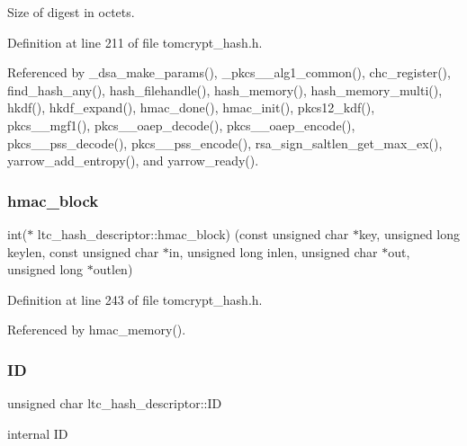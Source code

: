 Size of digest in octets. 



Definition at line 211 of file tomcrypt\+\_\+hash.\+h.



Referenced by \+\_\+dsa\+\_\+make\+\_\+params(), \+\_\+pkcs\+\_\+\_\+alg1\+\_\+common(), chc\+\_\+register(), find\+\_\+hash\+\_\+any(), hash\+\_\+filehandle(), hash\+\_\+memory(), hash\+\_\+memory\+\_\+multi(), hkdf(), hkdf\+\_\+expand(), hmac\+\_\+done(), hmac\+\_\+init(), pkcs12\+\_\+kdf(), pkcs\+\_\+\_\+mgf1(), pkcs\+\_\+\_\+oaep\+\_\+decode(), pkcs\+\_\+\_\+oaep\+\_\+encode(), pkcs\+\_\+\_\+pss\+\_\+decode(), pkcs\+\_\+\_\+pss\+\_\+encode(), rsa\+\_\+sign\+\_\+saltlen\+\_\+get\+\_\+max\+\_\+ex(), yarrow\+\_\+add\+\_\+entropy(), and yarrow\+\_\+ready().

\mbox{\label{structltc__hash__descriptor_a550b85ae2a58081a1f1d0add6e51a3cf}} 
\subsubsection{\texorpdfstring{hmac\_block}{hmac\_block}}
{\footnotesize\ttfamily int($\ast$ ltc\+\_\+hash\+\_\+descriptor\+::hmac\+\_\+block) (const unsigned char $\ast$key, unsigned long keylen, const unsigned char $\ast$in, unsigned long inlen, unsigned char $\ast$out, unsigned long $\ast$outlen)}



Definition at line 243 of file tomcrypt\+\_\+hash.\+h.



Referenced by hmac\+\_\+memory().

\mbox{\label{structltc__hash__descriptor_a6c8fd35cf5797e4c312eb7825e73c625}} 
\subsubsection{\texorpdfstring{ID}{ID}}
{\footnotesize\ttfamily unsigned char ltc\+\_\+hash\+\_\+descriptor\+::\+ID}



internal ID 



